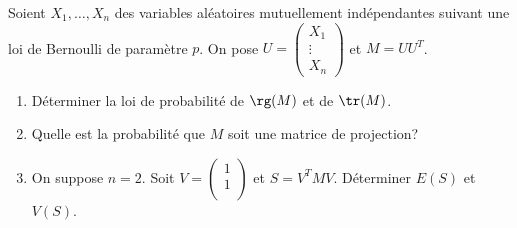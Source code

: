 \begin{enonce}
\begin{exercise}[ID={RMS126 E802},subtitle={Centrale PSI 2015},tags={}]
Soient $X_1,\dots,X_n$ des variables aléatoires mutuellement indépendantes suivant une loi de Bernoulli de paramètre $p$.
On pose $U= \begin{pmatrix} X_1\\ \vdots\\ X_n \end{pmatrix}$ et $M = U U^T$.
\begin{enumerate}
  \item Déterminer la loi de probabilité de $\rg(M)$ et de $\tr(M)$.

  \item Quelle est la probabilité que $M$ soit une matrice de projection?

  \item On suppose $n=2$.
    Soit $V= \begin{pmatrix} 1 \\ 1 \\ \end{pmatrix}$ et $S=V^T M V$.
    Déterminer $E(S)$ et $V(S)$.
\end{enumerate}
\end{exercise}
\begin{solution}
\end{solution}
\end{enonce}
